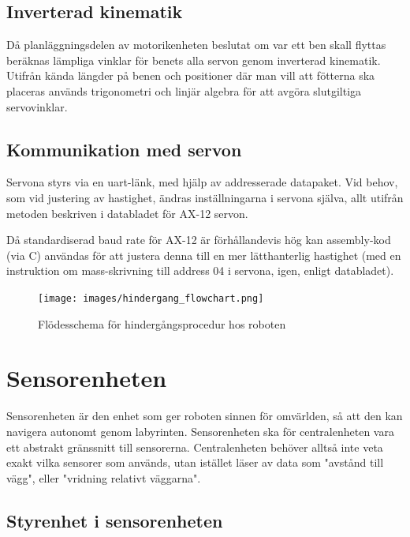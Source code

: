 \documentclass[a4paper,titlepage,12pt]{article}
\begin{document}
	\subsection{Inverterad kinematik}
	Då planläggningsdelen av motorikenheten beslutat om var ett ben skall flyttas beräknas 
	lämpliga vinklar för benets alla servon genom inverterad kinematik. Utifrån kända 
	längder på benen och positioner där man vill att fötterna ska placeras används 
	trigonometri och linjär algebra för att avgöra slutgiltiga servovinklar.

	\subsection{Kommunikation med servon}
	Servona styrs via en uart-länk, med hjälp av addresserade datapaket. Vid behov, 
	som vid justering av hastighet, ändras inställningarna i servona själva, allt 
	utifrån metoden beskriven i databladet för AX-12 servon.
	
	Då standardiserad baud rate för AX-12 är förhållandevis hög kan assembly-kod (via C) 
	användas för att justera denna till en mer lätthanterlig hastighet (med en instruktion
	om mass-skrivning till address 04 i servona, igen, enligt databladet).
	
	\begin{figure}[h!]
		\centering
		\texttt{[image: images/hindergang\_flowchart.png]}
		\caption{Flödesschema för hindergångsprocedur hos roboten \label{fig:walkflow1}}
	\end{figure}
    
    \newpage

	\section{Sensorenheten}
	
	Sensorenheten är den enhet som ger roboten sinnen för omvärlden, så att den
	kan navigera autonomt genom labyrinten. Sensorenheten ska för
	centralenheten vara ett abstrakt gränssnitt till sensorerna. Centralenheten
	behöver alltså inte veta exakt vilka sensorer som används, utan istället
	läser av data som "avstånd till vägg", eller "vridning relativt väggarna".

	\subsection{Styrenhet i sensorenheten}
\end{document}
